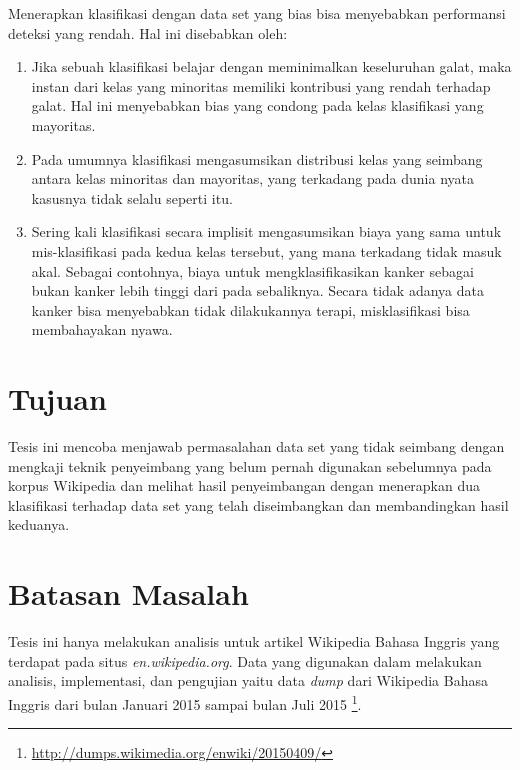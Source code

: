 \documentclass[12pt,a4paper,titlepage]{article}
\begin{document}
Menerapkan klasifikasi dengan data set yang bias bisa menyebabkan performansi deteksi yang rendah.
Hal ini disebabkan oleh:
\begin{enumerate}
	\item Jika sebuah klasifikasi belajar dengan meminimalkan keseluruhan galat, maka instan dari kelas yang minoritas memiliki kontribusi yang rendah terhadap galat.
Hal ini menyebabkan bias yang condong pada kelas klasifikasi yang mayoritas.
	\item Pada umumnya klasifikasi mengasumsikan distribusi kelas yang seimbang antara kelas minoritas dan mayoritas, yang terkadang pada dunia nyata kasusnya tidak selalu seperti itu.
	\item Sering kali klasifikasi secara implisit mengasumsikan biaya yang sama untuk mis-klasifikasi pada kedua kelas tersebut, yang mana terkadang tidak masuk akal.
Sebagai contohnya, biaya untuk mengklasifikasikan kanker sebagai bukan kanker lebih tinggi dari pada sebaliknya. 
Secara tidak adanya data kanker bisa menyebabkan tidak dilakukannya terapi, misklasifikasi bisa membahayakan nyawa.
\end{enumerate}



\section{Tujuan}\label{sec:tujuan}

Tesis ini mencoba menjawab permasalahan data set yang tidak seimbang dengan mengkaji teknik penyeimbang yang belum pernah digunakan sebelumnya pada korpus Wikipedia dan melihat hasil penyeimbangan dengan menerapkan dua klasifikasi terhadap data set yang telah diseimbangkan dan membandingkan hasil keduanya.

\section{Batasan Masalah}\label{sec:batasan-masalah}

Tesis ini hanya melakukan analisis untuk artikel Wikipedia Bahasa Inggris yang terdapat pada situs \textit{en.wikipedia.org}.
Data yang digunakan dalam melakukan analisis, implementasi, dan pengujian yaitu data \textit{dump} dari Wikipedia Bahasa Inggris dari bulan Januari 2015 sampai bulan Juli 2015
\footnote{\url{http://dumps.wikimedia.org/enwiki/20150409/}}.

\end{document}
